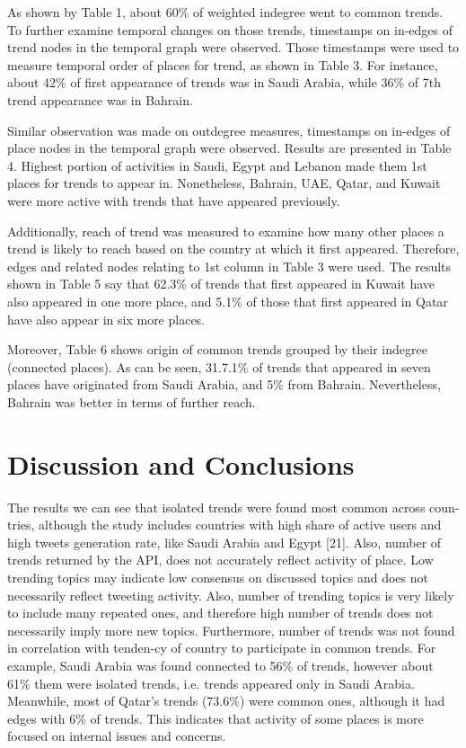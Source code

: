 \documentclass{llncs}
\begin{document}
As shown by Table 1, about 60\% of weighted indegree went to common
trends. To further examine temporal changes on those trends,
timestamps on in-edges of trend nodes in the temporal graph were
observed. Those timestamps were used to measure temporal order of
places for trend, as shown in Table 3. For instance, about 42\% of
first appearance of trends was in Saudi Arabia, while 36\% of 7th
trend appearance was in Bahrain.


Similar observation was made on outdegree measures, timestamps on
in-edges of place nodes in the temporal graph were observed. Results
are presented in Table 4. Highest portion of activities in Saudi,
Egypt and Lebanon made them 1st places for trends to appear
in. Nonetheless, Bahrain, UAE, Qatar, and Kuwait were more active with
trends that have appeared previously.


Additionally, reach of trend was measured to examine how many other
places a trend is likely to reach based on the country at which it
first appeared. Therefore, edges and related nodes relating to 1st
column in Table 3 were used. The results shown in Table 5 say that
62.3\% of trends that first appeared in Kuwait have also appeared in
one more place, and 5.1\% of those that first appeared in Qatar have
also appear in six more places.


Moreover, Table 6 shows origin of common trends grouped by their
indegree (connected places). As can be seen, 31.7.1\% of trends that
appeared in seven places have originated from Saudi Arabia, and 5\%
from Bahrain. Nevertheless, Bahrain was better in terms of further
reach.



\section{Discussion and Conclusions}\label{dissconc}

The results we can see that isolated trends were found most common
across coun-tries, although the study includes countries with high
share of active users and high tweets generation rate, like Saudi
Arabia and Egypt [21]. Also, number of trends returned by the API,
does not accurately reflect activity of place. Low trending topics may
indicate low consensus on discussed topics and does not necessarily
reflect tweeting activity. Also, number of trending topics is very
likely to include many repeated ones, and therefore high number of
trends does not necessarily imply more new topics. Furthermore, number
of trends was not found in correlation with tenden-cy of country to
participate in common trends. For example, Saudi Arabia was found
connected to 56\% of trends, however about 61\% them were isolated
trends, i.e. trends appeared only in Saudi Arabia. Meanwhile, most of
Qatar’s trends (73.6\%) were common ones, although it had edges with
6\% of trends. This indicates that activity of some places is more
focused on internal issues and concerns.
\end{document}
